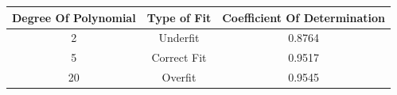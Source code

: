 \begin{center}    
    \begin{tabular}{|c|c|c|}
        \hline
        \bf{Degree Of Polynomial} & \bf{Type of Fit} & \bf{Coefficient Of Determination}\\
        \hline
        2 & Underfit & 0.8764 \\
        5 & Correct Fit & 0.9517\\
        20 & Overfit & 0.9545\\
        \hline
    \end{tabular} 
\end{center}